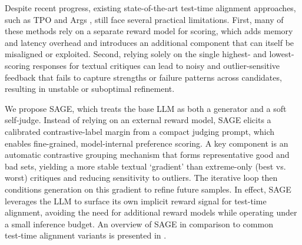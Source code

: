 \documentclass[11pt]{article}
\theoremstyle{plain}
\theoremstyle{definition}
\theoremstyle{remark}
\newcommand{\method}{SAGE}
\newcommand{\budget}{B}
\begin{document}
Despite recent progress, existing state-of-the-art test-time alignment approaches, such as TPO \cite{litest} and Args \cite{khanov2024args}, still face several practical limitations. First, many of these methods rely on a separate reward model for scoring, which adds memory and latency overhead and introduces an additional component that can itself be misaligned or exploited. Second, relying solely on the single highest- and lowest-scoring responses for textual critiques can lead to noisy and outlier-sensitive feedback that fails to capture strengths or failure patterns across candidates, resulting in unstable or suboptimal refinement.



We propose \method{}, which treats the base LLM as both a generator and a soft self-judge. Instead of relying on an external reward model, \method{} elicits a calibrated contrastive-label margin from a compact judging prompt, which enables fine-grained, model-internal preference scoring. A key component is an automatic contrastive grouping mechanism that forms representative good and bad sets, yielding a more stable textual `gradient' than extreme-only (best vs. worst) critiques and reducing sensitivity to outliers. The iterative loop then conditions generation on this gradient to refine future samples. In effect, \method{} leverages the LLM to surface its own implicit reward signal for test-time alignment, avoiding the need for additional reward models while operating under a small inference budget. An overview of \method{} in comparison to common test‑time alignment variants is presented in .
\end{document}
